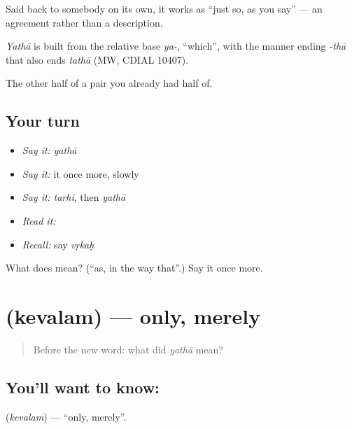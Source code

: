 Said back to somebody on its own, it works as \textquotedblleft{}just so, as you say\textquotedblright{} — an agreement rather than a description.

\begin{cousinweb}
\emph{Yathā} is built from the relative base \emph{ya-}, \textquotedblleft{}which\textquotedblright{}, with the manner ending \emph{-thā} that also ends \emph{tathā} (MW, CDIAL 10407).
\end{cousinweb}

\begin{grammarlens}[title={What you've built}]
The other half of a pair you already had half of.
\end{grammarlens}

\subsection*{Your turn}
\begin{itemize}
\raggedright
  \item \emph{Say it:} \emph{yathā}
  \item \emph{Say it:} it once more, slowly
  \item \emph{Say it:} \emph{tarhi}, then \emph{yathā}
  \item \emph{Read it:} \textbf{}
  \item \emph{Recall:} say \emph{vṛkaḥ}
\end{itemize}

\begin{tcolorbox}[breakable,colback=teal!4,colframe=teal!35!black,title={Before you move on}]
What does  mean? (\textquotedblleft{}as, in the way that\textquotedblright{}.) Say it once more.
\end{tcolorbox}
\section[\texorpdfstring{\sk{केवलम्} (kevalam)}{केवलम् (kevalam)}]{ (kevalam) — only, merely}

\label{lesson:SA-C49-only}



\begin{quote}
Before the new word: what did \emph{yathā} mean?
\end{quote}

\subsection*{You'll want to know: }
\textbf{} (\emph{kevalam}) — \textquotedblleft{}only, merely\textquotedblright{}.

